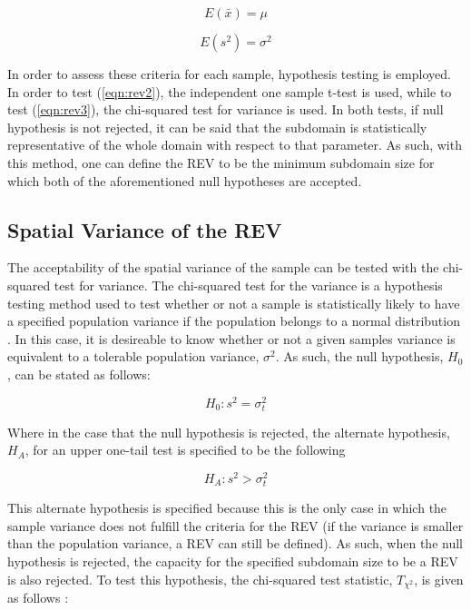 \begin{equation}
E\left(\bar{x}\right) = \mu
\label{eqn:rev2}
\end{equation}

\begin{equation}
E\left(s^2\right) = \sigma^2
\label{eqn:rev3}
\end{equation}

In order to assess these criteria for each sample, hypothesis testing is employed. In order to test (\ref{eqn:rev2}), the independent one sample t-test is used, while to test (\ref{eqn:rev3}), the chi-squared test for variance is used. In both tests, if null hypothesis is not rejected, it can be said that the subdomain is statistically representative of the whole domain with respect to that parameter. As such, with this method, one can define the REV to be the minimum subdomain size for which both of the aforementioned null hypotheses are accepted.

\subsection{Spatial Variance of the REV}

The acceptability of the spatial variance of the sample can be tested with the chi-squared test for variance. The chi-squared test for the variance is a hypothesis testing method used to test whether or not a sample is statistically likely to have a specified population variance if the population belongs to a normal distribution \citep{walpole_probability_2007}. In this case, it is desireable to know whether or not a given samples variance is equivalent to a tolerable population variance, $\sigma^2$. As such, the null hypothesis, $H_0$, can be stated as follows:

\begin{equation}
H_0:s^2=\sigma_t^2
\label{eqn:rev4}
\end{equation}

Where in the case that the null hypothesis is rejected, the alternate hypothesis, $H_A$, for an upper one-tail test is specified to be the following

\begin{equation}
H_A:s^2>\sigma_t^2
\label{eqn:rev5}
\end{equation}

This alternate hypothesis is specified because this is the only case in which the sample variance does not fulfill the criteria for the REV (if the variance is smaller than the population variance, a REV can still be defined). As such, when the null hypothesis is rejected, the capacity for the specified subdomain size to be a REV is also rejected. To test this hypothesis, the chi-squared test statistic, $T_{\chi^2}$, is given as follows \citep{walpole_probability_2007}:

